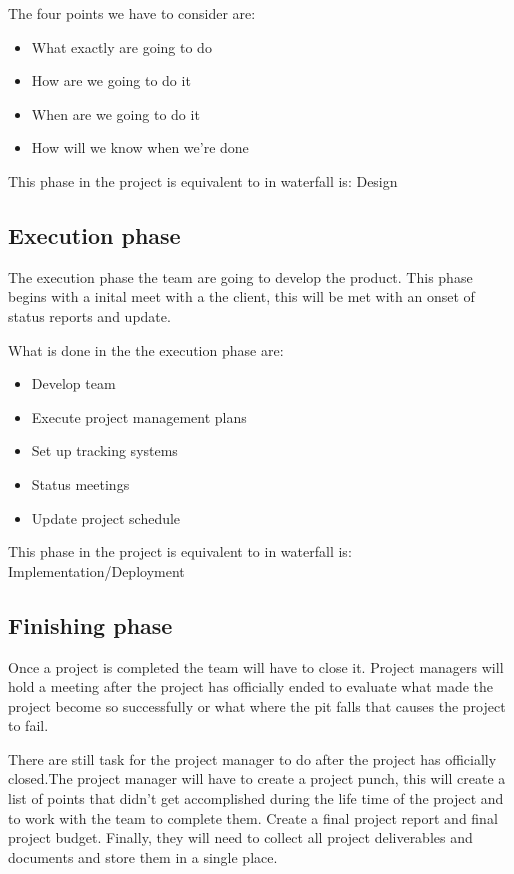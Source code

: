 \documentclass{article}
\begin{document}
The four points we have to consider are: 
\begin{itemize}
    \item What exactly are going to do
    \item How are we going to do it
    \item When are we going to do it
    \item How will we know when we're done
\end{itemize}

This phase in the project is equivalent to in waterfall is: Design

\subsection{Execution phase}
The execution phase the team are going to develop the product. This phase begins with a inital meet with a the client, this will be met with an onset of status reports and update. 

What is done in the the execution phase are:
\begin{itemize}
    \item Develop team
    \item Execute project management plans
    \item Set up tracking systems
    \item Status meetings
    \item Update project schedule
\end{itemize}

This phase in the project is equivalent to in waterfall is: Implementation/Deployment

\subsection{Finishing phase}

Once a project is completed the team will have to close it. Project managers will hold a meeting after the project has officially ended to evaluate what made the project become so successfully or what where the pit falls that causes the project to fail.

There are still task for the project manager to do after the project has officially closed.The project manager will have to create a project punch, this will create a list of points that didn't get accomplished during the life time of the project and to work with the team to complete them. Create a final project report and final project budget. Finally, they will need to collect all project deliverables and  documents and store them in a single place.
\end{document}
